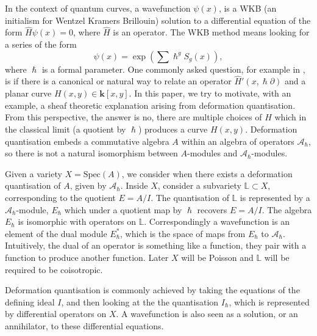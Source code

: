     In the context of quantum curves, a wavefunction \( \psi(x) \), is a WKB (an initialism for Wentzel Kramers Brillouin) solution to a differential equation of the form \( \widehat{H} \psi(x) = 0\), where \(\widehat{H}\) is an operator. The WKB method means looking for a series of the form \[ \psi(x) = \exp\left( \sum \hslash^g S_g(x) \right),\] where \(\hslash\) is a formal parameter. One commonly asked question, for example in \cite{norbury_quant, tudor,abpolyquant}, is if there is a canonical or natural way to relate an operator \( \widehat{H}'(x , \hslash \partial) \) and a planar curve \(H(x,y) \in \mathbf{k}[x,y]\). In this paper, we try to motivate, with an example, a sheaf theoretic explanation arising from deformation quantisation. From this perspective, the answer is no, there are multiple choices of \( \widehat{H}\) which in the classical limit (a quotient by \(\hslash\)) produces a curve \( H(x,y)\). Deformation quantisation embeds a commutative algebra \(A\) within an algebra of operators \( \mathcal{A}_\hslash \), so there is not a natural isomorphism between \( A\)-modules and \( \mathcal{A}_{\hslash}\)-modules. %
    
    Given a variety \(X= \mathrm{Spec}(A)\), we consider when there exists a deformation quantisation of \(A\), given by \(\mathcal{A}_{\hslash}\). Inside \(X\), consider a subvariety \( \mathbb{L} \subset X\), corresponding to the quotient \(E=A/I\). The quantisation of \( \mathbb{L}\) is represented by a \(\mathcal{A}_{\hslash}\)-module, \(E_\hslash\) which under a quotient map by \(\hslash\) recovers \(E=A/I\). The algebra \( E_{\hslash}\) is isomorphic with operators on \( \mathbb{L}\).
    Correspondingly a wavefunction is an element of the dual module \(E_\hslash^*\), which is the space of maps from \(E_\hslash\) to  \(\mathcal{A}_{\hslash} \). Intuitively, the dual of an operator is something like a function, they pair with a function to produce another function. Later \(X\) will be Poisson and \( \mathbb{L}\) will be required to be coisotropic.
    
    Deformation quantisation is commonly achieved by taking the equations of the defining ideal \(I\), and then looking at the the quantisation \(I_{\hslash}\), which is represented by differential operators on \(X\). A wavefunction is also seen as a solution, or an annihilator, to these differential equations.
    
    
